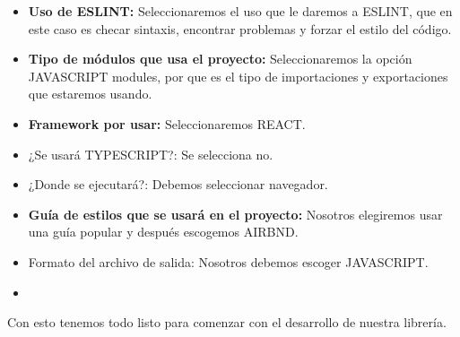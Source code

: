 \begin{itemize}
\item \textbf{Uso de ESLINT:  }Seleccionaremos el uso que le daremos a ESLINT, que en este caso es checar sintaxis, encontrar problemas y forzar el estilo del código.
\item \textbf{Tipo de módulos que usa el proyecto:} Seleccionaremos la opción JAVASCRIPT modules, por que es el tipo de importaciones y exportaciones que estaremos usando.
\item \textbf{Framework por usar: }Seleccionaremos REACT.
\item ¿Se usará TYPESCRIPT?: Se selecciona no. 
\item ¿Donde se ejecutará?: Debemos seleccionar navegador.
\item \textbf{Guía de estilos que se usará en el proyecto: } Nosotros elegiremos usar una guía popular  y después escogemos AIRBND.
\item Formato del archivo de salida: Nosotros debemos escoger JAVASCRIPT.
\item 
\end{itemize}
Con esto tenemos todo listo para comenzar con el desarrollo de nuestra librería.
\newpage

